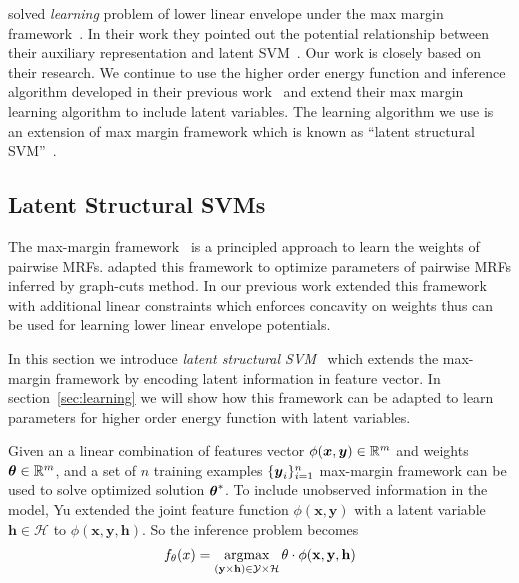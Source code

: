 \documentclass[sigconf, anonymous, review]{acmart}
\renewcommand{\citename}{\citet}
\renewcommand{\cite}{\citep}
\begin{document}
\citename{gouldlearning} solved \emph{learning} problem of lower
linear envelope under the max margin
framework~\cite{tsochantaridis2005large}. In their work they
pointed out the potential relationship between their auxiliary
representation and latent SVM~\cite{yu2009learning}. Our work is
closely based on their research. We continue to use the higher
order energy function and inference algorithm developed in their
previous work~\cite{Gould:ICML2011} and extend their max margin
learning algorithm to include latent variables. The learning
algorithm we use is an extension of max margin framework which is
known as ``latent structural SVM''~\cite{yu2009learning}.

\subsection{Latent Structural SVMs}
\label{sec:latent-struct-svms}

The max-margin
framework~\cite{Taskar:ICML05,tsochantaridis2005large} is a
principled approach to learn the weights of pairwise MRFs.
\citename{Szummer:ECCV08} adapted this framework to optimize
parameters of pairwise MRFs inferred by graph-cuts method. In our
previous work \citename{gouldlearning} extended this framework
with additional linear constraints which enforces concavity on
weights thus can be used for learning lower linear envelope
potentials.

In this section we introduce \emph{latent structural
  SVM}~\cite{yu2009learning} which extends the max-margin
framework by encoding latent information in feature vector. In
section~\ref{sec:learning} we will show how this framework can be
adapted to learn parameters for higher order energy function with
latent variables.

Given an a linear combination of features vector $\phi({\boldsymbol{x}} ,{\boldsymbol{y}})
\in \mathbb{R}^m$ and weights $\boldsymbol{\theta} \in \mathbb{R}^m$, and a set of
$n$ training examples $\{{\boldsymbol{y}}_i\}_{i=1}^n$ max-margin framework
can be used to solve optimized solution $\boldsymbol{\theta}^*$. To include
unobserved information in the model, Yu\cite{yu2009learning}
extended the joint feature function\cite{tsochantaridis2005large}
$\phi(\mathbf{x},\mathbf{y}) $ with a latent variable
$\mathbf{h}\in \mathcal{H}$ to
$\phi(\mathbf{x},\mathbf{y},\mathbf{h}) $. So the inference
problem becomes
\begin{align}
  \label{eq:latent_ssvm_linearcomb}
  f_\theta(x) = \mathop{\textrm{argmax}}_{(\mathbf{y} \times \mathbf{h}) \in \mathcal{Y}
  \times \mathcal{H}} \theta\cdot\phi(\mathbf{x},\mathbf{y},\mathbf{h})
\end{align}
\end{document}
